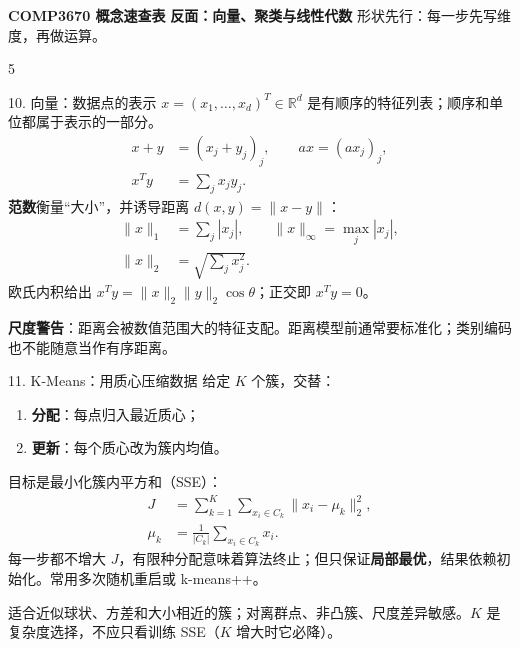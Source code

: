 \documentclass[a4paper,landscape,fontset=fandol]{ctexart}
\newcommand{\term}[1]{\textbf{\color{teal!80!black}#1}}
\newcommand{\warn}[1]{\textbf{\color{red}#1}}
\newcommand{\R}{\mathbb{R}}
\begin{document}
\begin{center}
  {\fontsize{14}{15}\selectfont\bfseries\color{navy} COMP3670 概念速查表}\quad
  {\large\bfseries\color{teal}反面：向量、聚类与线性代数}
  \hfill {\scriptsize 形状先行：每一步先写维度，再做运算。}
\end{center}
\vspace{-1.5mm}

\begin{multicols*}{5}

\begin{boxx}{10. 向量：数据点的表示}
$x=(x_1,\ldots,x_d)^T\in\R^d$ 是有顺序的特征列表；顺序和单位都属于表示的一部分。
\[
\begin{aligned}
x+y&=(x_j+y_j)_j,\qquad ax=(ax_j)_j,\\
x^Ty&=\sum_jx_jy_j.
\end{aligned}
\]
\term{范数}衡量“大小”，并诱导距离 $d(x,y)=\|x-y\|$：
\[
\begin{aligned}
\|x\|_1&=\sum_j|x_j|,\qquad \|x\|_\infty=\max_j|x_j|,\\
\|x\|_2&=\sqrt{\sum_jx_j^2}.
\end{aligned}
\]
欧氏内积给出 $x^Ty=\|x\|_2\|y\|_2\cos\theta$；正交即 $x^Ty=0$。

\warn{尺度警告}：距离会被数值范围大的特征支配。距离模型前通常要标准化；类别编码也不能随意当作有序距离。
\end{boxx}

\begin{boxx}{11. K-Means：用质心压缩数据}
给定 $K$ 个簇，交替：
\begin{enumerate}
  \item \term{分配}：每点归入最近质心；
  \item \term{更新}：每个质心改为簇内均值。
\end{enumerate}
目标是最小化簇内平方和（SSE）：
\[
\begin{aligned}
J&=\sum_{k=1}^K\sum_{x_i\in C_k}\|x_i-\mu_k\|_2^2,\\
\mu_k&=\frac1{|C_k|}\sum_{x_i\in C_k}x_i.
\end{aligned}
\]
每一步都不增大 $J$，有限种分配意味着算法终止；但只保证\term{局部最优}，结果依赖初始化。常用多次随机重启或 k-means++。

适合近似球状、方差和大小相近的簇；对离群点、非凸簇、尺度差异敏感。$K$ 是复杂度选择，不应只看训练 SSE（$K$ 增大时它必降）。
\end{boxx}

\columnbreak


\end{multicols*}
\end{document}
